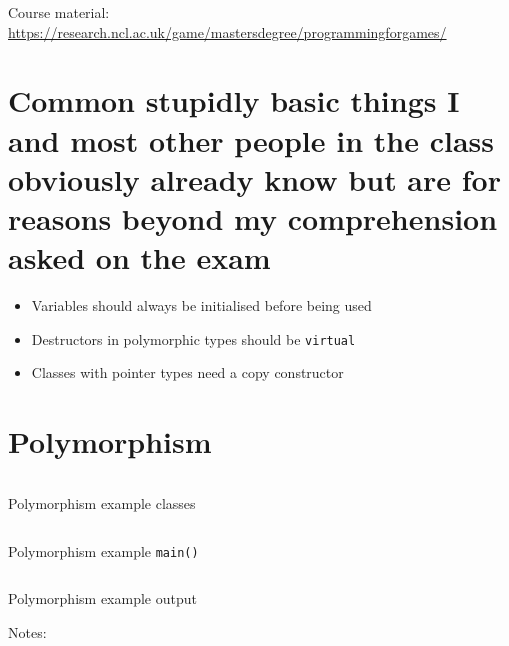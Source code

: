 \documentclass[a4paper]{article}
\begin{document}
\tableofcontents

\vfill
Course material:
\url{https://research.ncl.ac.uk/game/mastersdegree/programmingforgames/}

\section{Common stupidly basic things I and most other people in the class
         obviously already know but are for reasons beyond my comprehension
         asked on the exam}

\begin{itemize}
  \item
    Variables should always be initialised before being used

  \item
    Destructors in polymorphic types should be \texttt{virtual}

  \item
    Classes with pointer types need a copy constructor

\end{itemize}

\section{Polymorphism}

\begin{listing}[h!]
  \inputminted[linenos,frame=lines,firstline=5,lastline=43]{cpp}{listings/polymorphism_1.cpp}
  \caption{Polymorphism example classes}
  \label{listing:polymorphism_1}
\end{listing}
\FloatBarrier

\begin{listing}[h!]
  \inputminted[linenos,frame=lines,firstline=45]{cpp}{listings/polymorphism_1.cpp}
  \caption{Polymorphism example \texttt{main()}}
  \label{listing:polymorphism_1_main}
\end{listing}
\FloatBarrier

\begin{listing}[h!]
  \inputminted[linenos,frame=lines]{text}{out/polymorphism_1.txt}
  \caption{Polymorphism example output}
  \label{listing:polymorphism_1_out}
\end{listing}
\FloatBarrier

Notes:
\end{document}
